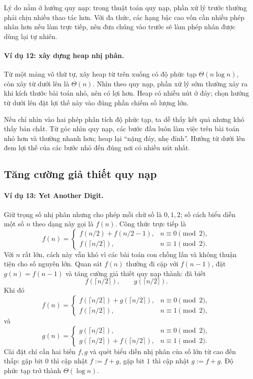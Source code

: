 \documentclass[11pt]{article}
\begin{document}
Lý do nằm ở hướng quy nạp: trong thuật toán quy nạp, phần xử lý trước thường
phải chịu nhiều thao tác hơn. Với đa thức, các hạng bậc cao vốn cần nhiều
phép nhân hơn nếu làm trực tiếp, nên đưa chúng vào trước sẽ làm phép nhân
được dùng lại tự nhiên.

\paragraph{Ví dụ 12: xây dựng heap nhị phân.}
Từ một mảng vô thứ tự, xây heap từ trên xuống có độ phức tạp
\(\Theta(n\log n)\), còn xây từ dưới lên là \(\Theta(n)\). Nhìn theo quy nạp,
phần xử lý sớm thường xảy ra khi kích thước bài toán nhỏ, nên có lợi hơn.
Heap có nhiều nút ở đáy; chọn hướng từ dưới lên đặt lợi thế này vào đúng phần
chiếm số lượng lớn.

Nếu chỉ nhìn vào hai phép phân tích độ phức tạp, ta dễ thấy kết quả nhưng khó
thấy bản chất. Từ góc nhìn quy nạp, các bước đầu luôn làm việc trên bài toán
nhỏ hơn và thường nhanh hơn; heap lại ``nặng đáy, nhẹ đỉnh''. Hướng từ dưới
lên đem lợi thế của các bước nhỏ đến đúng nơi có nhiều nút nhất.

\subsection{Tăng cường giả thiết quy nạp}

\paragraph{Ví dụ 13: Yet Another Digit.}
Giữ trọng số nhị phân nhưng cho phép mỗi chữ số là \(0,1,2\); số cách biểu
diễn một số \(n\) theo dạng này gọi là \(f(n)\). Công thức trực tiếp là
\[
f(n)=
\begin{cases}
  f(n/2)+f(n/2-1), & n\equiv 0 \pmod 2,\\
  f(\lceil n/2\rceil), & n\equiv 1 \pmod 2.
\end{cases}
\]
Với \(n\) rất lớn, cách này vẫn khó vì các bài toán con chồng lấn và không
thuận tiện cho số nguyên lớn. Quan sát \(f(n)\) thường đi cặp với \(f(n-1)\),
đặt \(g(n)=f(n-1)\) và tăng cường giả thiết quy nạp thành: đã biết
\[
  f(\lceil n/2\rceil),\qquad g(\lceil n/2\rceil).
\]
Khi đó
\[
f(n)=
\begin{cases}
  f(\lceil n/2\rceil)+g(\lceil n/2\rceil), & n\equiv 0 \pmod 2,\\
  f(\lceil n/2\rceil), & n\equiv 1 \pmod 2,
\end{cases}
\]
và
\[
g(n)=
\begin{cases}
  g(\lceil n/2\rceil), & n\equiv 0 \pmod 2,\\
  g(\lceil n/2\rceil)+f(\lceil n/2\rceil), & n\equiv 1 \pmod 2.
\end{cases}
\]
Cài đặt chỉ cần hai biến \(f,g\) và quét biểu diễn nhị phân của số lớn từ cao
đến thấp: gặp bit \(0\) thì cập nhật \(f:=f+g\), gặp bit \(1\) thì cập nhật
\(g:=f+g\). Độ phức tạp trở thành \(\Theta(\log n)\).
\end{document}
